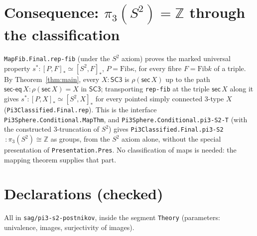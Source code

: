 \documentclass[11pt]{amsart}
\theoremstyle{definition}
\theoremstyle{remark}
\newcommand{\code}[1]{\texttt{#1}}
\newcommand{\Fib}{\mathrm{Fib}}
\newcommand{\SC}{\mathsf{SC3}}
\begin{document}
\section{Consequence: $\pi_3(S^2)=\mathbb{Z}$ through the classification}

\code{MapFib.Final.rep-fib} (under the $S^2$ axiom) proves the marked universal property
$s^*:[P,F]_*\simeq[S^2,F]_*$, $P=\Fib\kappa$, for every fibre $F=\Fib k$ of a triple. By
Theorem~\ref{thm:main}, every $X:\SC$ is $\rho(\mathsf{sec}\,X)$ up to the path
$\mathsf{sec\text{-}eq}\,X:\rho(\mathsf{sec}\,X)=X$ in $\SC$; transporting \code{rep-fib} at the
triple $\mathsf{sec}\,X$ along it gives $s^*:[P,X]_*\simeq[S^2,X]_*$ for every pointed simply
connected 3-type $X$ (\code{Pi3Classified.Final.rep}). This is the interface
\code{Pi3Sphere.Conditional.MapThm}, and \code{Pi3Sphere.Conditional.pi3-S2-T} (with the constructed
3-truncation of $S^2$) gives \code{Pi3Classified.Final.pi3-S2}$\,:\pi_3(S^2)\cong\mathbb{Z}$ as groups,
from the $S^2$ axiom alone, without the special presentation of \code{Presentation.Pres}. No
classification of maps is needed: the mapping theorem supplies that part.

\section{Declarations (checked)}

All in \code{sag/pi3-s2-postnikov}, inside the segment \code{Theory} (parameters: univalence,
images, surjectivity of images).
\end{document}
